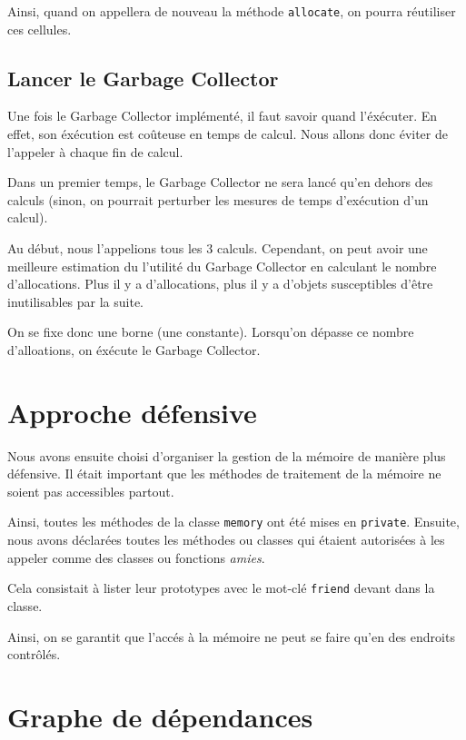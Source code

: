 \documentclass[12pt]{article}
\def\code #1{\lstinline{#1}}
\begin{document}
Ainsi, quand on appellera de nouveau la méthode \code{allocate}, on pourra réutiliser ces cellules.


\subsection{Lancer le Garbage Collector}
Une fois le Garbage Collector implémenté, il faut savoir quand l'éxécuter. En effet, son éxécution est coûteuse en temps de calcul. Nous allons donc éviter de l'appeler à chaque fin de calcul.

Dans un premier temps, le Garbage Collector ne sera lancé qu'en dehors des calculs (sinon, on pourrait perturber les mesures de temps d'exécution d'un calcul).

Au début, nous l'appelions tous les 3 calculs. Cependant, on peut avoir une meilleure estimation du l'utilité du Garbage Collector en calculant le nombre d'allocations. Plus il y a d'allocations, plus il y a d'objets susceptibles d'être inutilisables par la suite.

On se fixe donc une borne (une constante). Lorsqu'on dépasse ce nombre d'alloations, on éxécute le Garbage Collector.

\section{Approche défensive}

Nous avons ensuite choisi d'organiser la gestion de la mémoire de manière plus défensive. Il était important que les méthodes de traitement de la mémoire ne soient pas accessibles partout.

Ainsi, toutes les méthodes de la classe \code{memory} ont été mises en \code{private}. Ensuite, nous avons déclarées toutes les méthodes ou classes qui étaient autorisées à les appeler comme des classes ou fonctions \emph{amies}.

Cela consistait à lister leur prototypes avec le mot-clé \code{friend} devant dans la classe.

Ainsi, on se garantit que l'accés à la mémoire ne peut se faire qu'en des endroits contrôlés.



\section{Graphe de dépendances}
\end{document}
